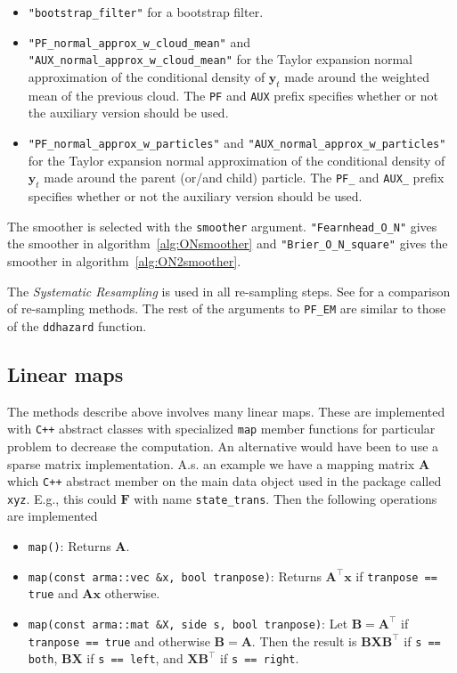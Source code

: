 \documentclass[9pt, notitlepage]{article}
\renewcommand{\vec}[1]{\bm{#1}}
\newcommand{\mat}[1]{\mathbf{#1}}
\begin{document}
\begin{itemize}
	\item \verb|"bootstrap_filter"| for a bootstrap filter.
	\item \verb|"PF_normal_approx_w_cloud_mean"| and \verb|"AUX_normal_approx_w_cloud_mean"| for the Taylor expansion normal approximation of the conditional density of $\vec{y}_t$ made around the weighted mean of the previous cloud. The \verb|PF| and \verb|AUX| prefix specifies whether or not the auxiliary version should be used.
	\item \verb|"PF_normal_approx_w_particles"| and \verb|"AUX_normal_approx_w_particles"| for the Taylor expansion normal approximation of the conditional density of $\vec{y}_t$ made around the parent (or/and child) particle. The \verb|PF_| and \verb|AUX_| prefix specifies whether or not the auxiliary version should be used.
\end{itemize}

The smoother is selected with the \verb|smoother| argument. \verb|"Fearnhead_O_N"| gives the smoother in algorithm~\ref{alg:ONsmoother} and \verb|"Brier_O_N_square"| gives the smoother in algorithm~\ref{alg:ON2smoother}.

The \emph{Systematic Resampling} \citep{kitagawa96} is used in all re-sampling steps. See \cite{douc05} for a comparison of re-sampling methods. The rest of the arguments to \verb|PF_EM| are similar to those of the \verb|ddhazard| function.

\subsection{Linear maps}
The methods describe above involves many linear maps. These are implemented with \verb|C++| abstract classes with specialized \verb|map| member functions for particular problem to decrease the computation. An alternative would have been to use a sparse matrix implementation. A.s. an example we have a mapping matrix $\mat{A}$ which \verb|C++| abstract member on the main data object used in the package called \verb|xyz|. E.g., this could $\mat{F}$ with name \verb|state_trans|. Then the following operations are implemented 

\begin{itemize}
\item \verb|map()|: Returns $\mat{A}$.
%
\item \verb|map(const arma::vec &x, bool tranpose)|: Returns $\mat{A}^\top\vec{x}$ if \verb|tranpose == true| and $\mat{A}\vec{x}$ otherwise.
%
\item \verb|map(const arma::mat &X, side s, bool tranpose)|: Let $\mat{B}=\mat{A}^\top$ if  \verb|tranpose == true| and otherwise $\mat{B}=\mat{A}$. Then the result is  $\mat{B}\mat{X}\mat{B}^\top$ if \verb|s == both|, $\mat{B}\mat{X}$ if \verb|s == left|, and $\mat{X}\mat{B}^\top$ if \verb|s == right|.
\end{itemize}
\end{document}
